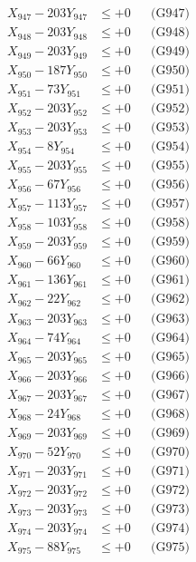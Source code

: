 \documentclass[a4paper,10pt]{article}
\begin{document}
{\begin{align}
X_{947} - 203Y_{947} &\leq +0 && \text{(G947)} \\
X_{948} - 203Y_{948} &\leq +0 && \text{(G948)} \\
X_{949} - 203Y_{949} &\leq +0 && \text{(G949)} \\
X_{950} - 187Y_{950} &\leq +0 && \text{(G950)} \\
\allowbreak
X_{951} - 73Y_{951} &\leq +0 && \text{(G951)} \\
X_{952} - 203Y_{952} &\leq +0 && \text{(G952)} \\
X_{953} - 203Y_{953} &\leq +0 && \text{(G953)} \\
X_{954} - 8Y_{954} &\leq +0 && \text{(G954)} \\
X_{955} - 203Y_{955} &\leq +0 && \text{(G955)} \\
X_{956} - 67Y_{956} &\leq +0 && \text{(G956)} \\
X_{957} - 113Y_{957} &\leq +0 && \text{(G957)} \\
X_{958} - 103Y_{958} &\leq +0 && \text{(G958)} \\
X_{959} - 203Y_{959} &\leq +0 && \text{(G959)} \\
X_{960} - 66Y_{960} &\leq +0 && \text{(G960)} \\
\allowbreak
X_{961} - 136Y_{961} &\leq +0 && \text{(G961)} \\
X_{962} - 22Y_{962} &\leq +0 && \text{(G962)} \\
X_{963} - 203Y_{963} &\leq +0 && \text{(G963)} \\
X_{964} - 74Y_{964} &\leq +0 && \text{(G964)} \\
X_{965} - 203Y_{965} &\leq +0 && \text{(G965)} \\
X_{966} - 203Y_{966} &\leq +0 && \text{(G966)} \\
X_{967} - 203Y_{967} &\leq +0 && \text{(G967)} \\
X_{968} - 24Y_{968} &\leq +0 && \text{(G968)} \\
X_{969} - 203Y_{969} &\leq +0 && \text{(G969)} \\
X_{970} - 52Y_{970} &\leq +0 && \text{(G970)} \\
\allowbreak
X_{971} - 203Y_{971} &\leq +0 && \text{(G971)} \\
X_{972} - 203Y_{972} &\leq +0 && \text{(G972)} \\
X_{973} - 203Y_{973} &\leq +0 && \text{(G973)} \\
X_{974} - 203Y_{974} &\leq +0 && \text{(G974)} \\
X_{975} - 88Y_{975} &\leq +0 && \text{(G975)} \\

\end{align}}
\end{document}
